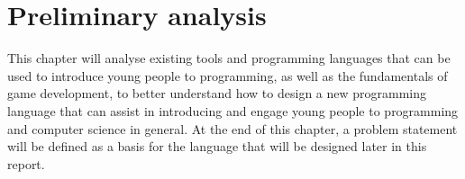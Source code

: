 \chapter{Preliminary analysis}


This chapter will analyse existing tools and programming languages that can be used to introduce young people to programming, as well as the fundamentals of game development, to better understand how to design a new programming language that can assist in introducing and engage young people to programming and computer science in general. At the end of this chapter, a problem statement will be defined as a basis for the language that will be designed later in this report.












